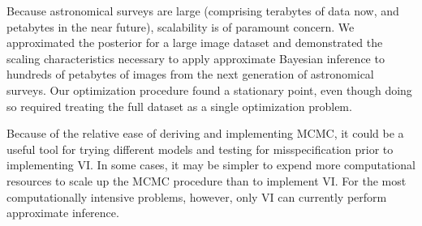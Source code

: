 Because astronomical surveys are large (comprising terabytes of data now, and petabytes in the near future), scalability is of paramount concern.
We approximated the posterior for a large image dataset and demonstrated the scaling characteristics necessary to apply approximate Bayesian inference to hundreds of petabytes of images from the next generation of astronomical surveys.
Our optimization procedure found a stationary point, even though doing so required treating the full dataset as a single optimization problem.

Because of the relative ease of deriving and implementing MCMC, it could be a useful tool for trying different models and testing for misspecification prior to implementing VI. In some cases, it may be simpler to expend more computational resources to scale up the MCMC procedure than to implement VI. For the most computationally intensive problems, however, only VI can currently perform approximate inference.
